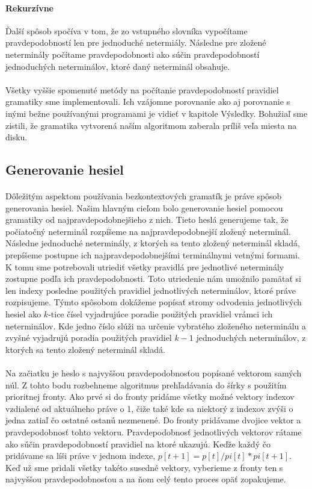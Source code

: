 \paragraph{Rekurzívne}
Ďalší spôsob spočíva v tom, že zo vstupného slovníka vypočítame pravdepodobností len pre jednoduché netermiály. Následne pre zložené neterminály počítame pravdepodobnosti ako súčin pravdepodobností jednoduchých neterminálov, ktoré daný neterminál obsahuje.
\paragraph{}
Všetky vyššie spomenuté metódy na počítanie pravdepodobností pravidiel gramatiky sme implementovali. Ich vzájomne porovnanie ako aj porovnanie s inými bežne používanými programami je vidieť v kapitole Výsledky. Bohužiaľ sme zistili, že gramatika vytvorená naším algoritmom zaberala príliš veľa miesta na disku.

\subsection{Generovanie hesiel}
\paragraph{}
Dôležitým aspektom používania bezkontextových gramatík je práve spôsob generovania hesiel. Našim hlavným cieľom bolo generovanie hesiel pomocou gramatiky od najpravdepodobnejšieho z nich. Tieto heslá generujeme tak, že počiatočný neterminál rozpíšeme na najpravdepodobnejší zložený neterminál. Následne jednoduché neterminály, z ktorých sa tento zložený neterminál skladá, prepíšeme postupne ich najpravdepodobnejšími terminálnymi vetnými formami. K tomu sme potrebovali utriediť všetky pravidlá pre jednotlivé neterminály zostupne podľa ich pravdepodobnosti. Toto utriedenie nám umožnilo pamätať si len indexy posledne použitých pravidiel jednotlivých neterminálov, ktoré práve rozpisujeme. Týmto spôsobom dokážeme popísať stromy odvodenia jednotlivých hesiel ako \(k\)-tice čísel vyjadrujúce poradie použitých pravidiel vrámci ich neterminálov. Kde jedno číslo slúži na určenie vybratého zloženého neterminálu a zvyšné vyjadrujú poradia použitých pravidiel \(k-1\) jednoduchých neterminálov, z ktorých sa tento zložený neterminál skladá.
\paragraph{}
Na začiatku je heslo s najvyššou pravdepodobnosťou popísané vektorom samých núl. Z tohto bodu rozbehneme algoritmus prehľadávania do šírky s použitím prioritnej fronty. Ako prvé si do fronty pridáme všetky možné vektory indexov vzdialené od aktuálneho práve o 1, čiže také kde sa niektorý z indexov zvýši o jedna zatiaľ čo ostatné ostanú nezmenené. Do fronty pridávame dvojice vektor a pravdepodobnosť tohto vektoru. Pravdepodobnosť jednotlivých vektorov rátame ako súčin pravdepodobností pravidiel na ktoré ukazujú. Keďže každý čo pridávame sa líši práve v jednom indexe, \(p[t+1] = p[t] / pi[t] * pi[t+1]\). Keď už sme pridali všetky takéto susedné vektory, vyberieme z fronty ten s najvyššou pravdepodobnosťou a na ňom celý tento proces opäť zopakujeme.
